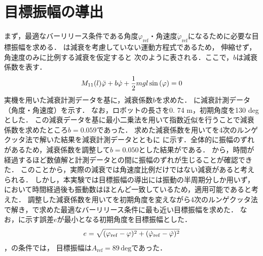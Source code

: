         \section{目標振幅の導出}
          
          まず，最適なバーリリース条件である角度$\varphi_{\mathrm{ref}}$・角速度$\dot{\varphi}_{\mathrm{ref}}$になるために必要な目標振幅を求める．
          は減衰を考慮していない運動方程式であるため，
          伸縮せず，角速度のみに比例する減衰を仮定すると
          次のように表される．ここで，$b$は減衰係数を表す．
          \begin{eqnarray}
            \equlabel{dampingEquation}
            M_{11}(l)\ddot{\varphi}+b\dot{\varphi}+\frac{1}{2}mgl\sin{(\varphi)}=0          
            \end{eqnarray}
          実機を用いた減衰計測データを基に，減衰係数$b$を求めた．
          \figref{}に減衰計測データ（角度・角速度）を示す．
          なお，ロボットの長さを0. 74 m，初期角度を130 degとした．
          この減衰データを基に最小二乗法を用いて指数近似を行うことで減衰係数を求めたところ$b=0.059$であった．
          求めた減衰係数を用いてを4次のルンゲクッタ法で解いた結果を減衰計測データとともに
          \figref{}に示す．全体的に振幅のずれがあるため，減衰係数を調整して$b=0.050$とした結果が\figref{}である．
          \figref{}から，時間が経過するほど数値解と計測データとの間に振幅のずれが生じることが確認できた．
          このことから，実際の減衰では角速度比例だけではない減衰があると考えられる．
          しかし，本実験では目標振幅の導出には振動の半周期分しか用いず，
          \figref{}において時間経過後も振動数はほとんど一致しているため，適用可能であると考えた．
          調整した減衰係数を用いてを初期角度を変えながら4次のルンゲクッタ法で解き，で求めた最適なバーリリース条件に最も近い目標振幅を求めた．
          なお，に示す誤差$e$が最小となる初期角度を目標振幅とした．
          \begin{eqnarray}
            \equlabel{error}
            e=\sqrt{(\varphi_{\mathrm{ref}}-\varphi)^2+(\dot{\varphi}_{\mathrm{ref}}-\dot{\varphi})^2}
            \end{eqnarray}
          ，の条件では，
          目標振幅は$A_{\mathrm{ref}}=89\,\mathrm{deg}$であった．

